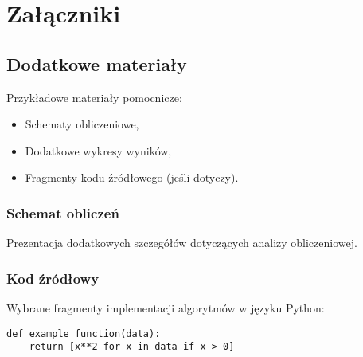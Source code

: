 \chapter{Załączniki}

\section{Dodatkowe materiały}
Przykładowe materiały pomocnicze:
\begin{itemize}
    \item Schematy obliczeniowe,
    \item Dodatkowe wykresy wyników,
    \item Fragmenty kodu źródłowego (jeśli dotyczy).
\end{itemize}

\subsection{Schemat obliczeń}
Prezentacja dodatkowych szczegółów dotyczących analizy obliczeniowej.

\subsection{Kod źródłowy}
Wybrane fragmenty implementacji algorytmów w języku Python:
\begin{verbatim}
def example_function(data):
    return [x**2 for x in data if x > 0]
\end{verbatim}
